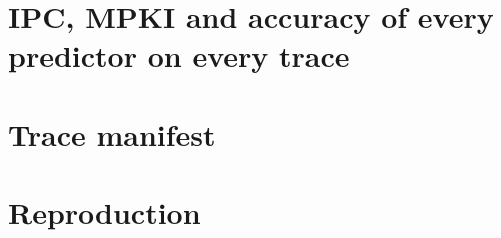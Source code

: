 \documentclass[11pt,a4paper]{article}
\renewcommand{\_}{\textunderscore\allowbreak}
\begin{document}



\appendix
\section{IPC, MPKI and accuracy of every predictor on every trace}\label{app:all}
{\footnotesize\setlength{\tabcolsep}{4pt}}
{\footnotesize\setlength{\tabcolsep}{4pt}}
{\footnotesize\setlength{\tabcolsep}{4pt}}

\section{Trace manifest}\label{app:manifest}
{\small}

\section{Reproduction}\label{app:repro}

\end{document}
